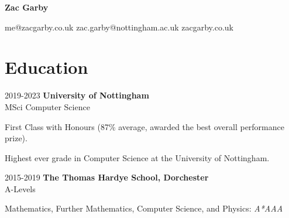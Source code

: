 \documentclass[12pt]{article}
\newcommand{\sqsep}{\quad {\tiny $\blacksquare$} \quad}
\begin{document}
\begin{center}
	{\HUGE \textbf{Zac Garby}}
	
	me@zacgarby.co.uk \sqsep
	zac.garby@nottingham.ac.uk \sqsep
	zacgarby.co.uk
\end{center}

\vspace{-1em} %

\section*{Education}

\begin{explist}
	\item[2019-2023] \textbf{University of Nottingham} \\
		  MSci Computer Science
		  {\small
		  \begin{explist}
		  	\item[] First Class with Honours (87\% average, awarded the best overall performance prize).
			\item[] Highest ever grade in Computer Science at the University of Nottingham.
		  \end{explist}
		  }
		  
	\item[2015-2019] \textbf{The Thomas Hardye School, Dorchester } \\
		A-Levels
		{\small
		\begin{explist}
			\item[] Mathematics, Further Mathematics, Computer Science, and Physics: \textit{A*AAA}
		\end{explist}
		}
\end{explist}

\vspace{-1em}
\end{document}
